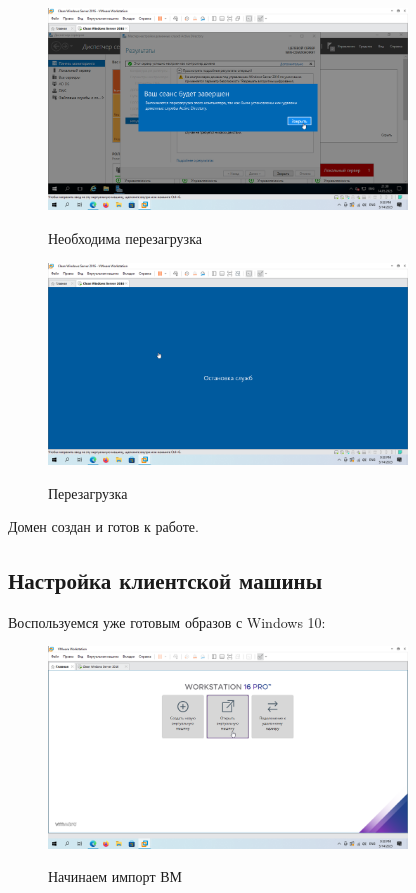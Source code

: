 \documentclass[a4paper]{article}
\begin{document}
  \begin{figure}[H]
    \centering
    \includegraphics[width=0.85\textwidth]{5_0052}
    \label{img:52}
    \caption{Необходима перезагрузка}
  \end{figure}

  \begin{figure}[H]
    \centering
    \includegraphics[width=0.85\textwidth]{5_0053}
    \label{img:53}
    \caption{Перезагрузка}
  \end{figure}

  Домен создан и готов к работе.

  \subsection{Настройка клиентской машины}

  Воспользуемся уже готовым образов с Windows 10:

  \begin{figure}[H]
    \centering
    \includegraphics[width=0.85\textwidth]{5_0054}
    \label{img:54}
    \caption{Начинаем импорт ВМ}
  \end{figure}
\end{document}
